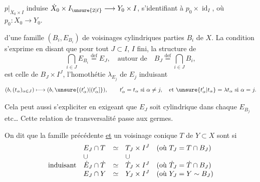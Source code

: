 $p|_{\dot X_0\times I}$ induise $\dot X_0\times I_{\unsure{2|\ell}}\longrightarrow Y_0\times I$,
s'identifiant à $p_0\times\operatorname{id}_I$, où $p_0:X_0\longrightarrow Y_0$.

 d'une famille 
$(B_i,E_{B_i})$ de voisinages cylindriques  parties $B_i$ de $X$.
La condition s'exprime en disant que pour
tout $J\subset I$, $I$ fini, la structure de
\[
\bigcap_{i\in J}E_{B_i}\overset{\mathrm{def}}=E_J,
\quad\text{autour de}\quad
B_J\overset{\mathrm{def}}=\bigcap_{i\in J}B_i,
\]
est celle de $B_J\times I^J$, l'homothétie
$\lambda_{E_j}$ de $E_j$  induisant
\[
(b,(t_\alpha)_{\alpha\in J})\longmapsto(b,\unsure{(t'_\alpha)|(t'_\alpha]}),
\qquad
t'_\alpha=t_\alpha\ \text{si }\alpha\ne j,\quad
\text{et }\unsure{t'_\alpha|t_\alpha}=\lambda t_\alpha\ \text{si }\alpha=j.
\]

Cela peut aussi s'expliciter en exigeant
que $E_J$ soit cylindrique dans chaque $E_{B_j}$ etc\ldots
Cette relation de transversalité passe aux germes.

On dit que la famille précédente \uline{et}
un voisinage conique $T$ de $Y\subset X$ sont
 
si 
\[
\begin{array}{l@{\quad}lcl@{\quad}l}
& E_J\cap T & \simeq & T_J\times I^J
& (\text{où }T_J=T\cap B_J)\\
&\cup&&\cup&\\
\text{induisant}&\dot E_J\cap\dot T&\simeq&\dot T_J\times I^J
&(\text{où }\dot T_J=\dot T\cap B_J)\\
&E_J\cap Y&\simeq&Y_J\times I^J
&(\text{où }Y_J=Y\sim B_J)
\end{array}
\]
